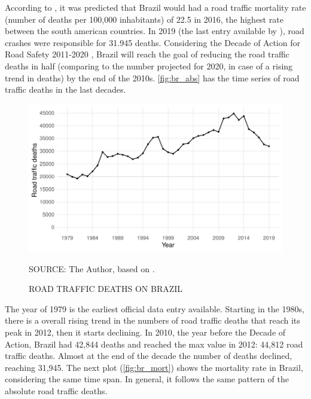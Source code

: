 According to \textcite{WHO2018}, it was predicted that Brazil would had a road traffic mortality rate (number of deaths per 100,000 inhabitants) of 22.5 in 2016, the highest rate between the south american countries. In 2019 (the last entry available by \textcite{MinistryofHealth2020}), road crashes were responsible for 31.945 deaths. Considering the Decade of Action for Road Safety 2011-2020 \cite{WHO2011}, Brazil will reach the goal of reducing the road traffic deaths in half (comparing to the number projected for 2020, in case of a rising trend in deaths) by the end of the 2010s. \autoref{fig:br_abs} has the time series of road traffic deaths in the last decades.  

\begin{figure}[!htbp]
    \centering\footnotesize
    \captionsetup{font=footnotesize}
    \caption{ROAD TRAFFIC DEATHS ON BRAZIL}
    \includegraphics{fig/brazil_abs.pdf}
    \label{fig:br_abs}
    \par SOURCE: The Author, based on \textcite{MinistryofHealth2020}.
\end{figure}

The year of 1979 is the earliest official data entry available. Starting in the 1980s, there is a overall rising trend in the numbers of road traffic deaths that reach its peak in 2012, then it starts declining. In 2010, the year before the Decade of Action, Brazil had 42,844 deaths and reached the max value in 2012: 44,812 road traffic deaths. Almost at the end of the decade the number of deaths declined, reaching 31,945. The next plot (\autoref{fig:br_mort}) shows the mortality rate in Brazil, considering the same time span. In general, it follows the same pattern of the absolute road traffic deaths.


